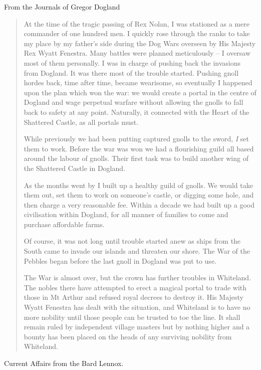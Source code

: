From the Journals of Gregor Dogland

\begin{quotation}

	At the time of the tragic passing of Rex Nolan, I was stationed as a mere commander of one hundred men.  I quickly rose through the ranks to take my place by my father's side during the Dog Wars overseen by His Majesty Rex Wyatt Fenestra.  Many battles were planned meticulously -- I oversaw most of them personally.  I was in charge of pushing back the invasions from Dogland.  It was there most of the trouble started.  Pushing gnoll hordes back, time after time, became wearisome, so eventually I happened upon the plan which won the war: we would create a portal in the centre of Dogland and wage perpetual warfare without allowing the gnolls to fall back to safety at any point.  Naturally, it connected with the Heart of the Shattered Castle, as all portals must.

	While previously we had been putting captured gnolls to the sword, \emph{I} set them to work.  Before the war was won we had a flourishing guild all based around the labour of gnolls.  Their first task was to build another wing of the Shattered Castle in Dogland.

	As the months went by I built up a healthy guild of gnolls.  We would take them out, set them to work on someone's castle, or digging some hole, and then charge a very reasonable fee.  Within a decade we had built up a good civilisation within Dogland, for all manner of families to come and purchase affordable farms.

	Of course, it was not long until trouble started anew as ships from the South came to invade our islands and threaten our shore.  The War of the Pebbles began before the last gnoll in Dogland was put to use.

	The War is almost over, but the crown has further troubles in Whiteland.  The nobles there have attempted to erect a magical portal to trade with those in Mt Arthur and refused royal decrees to destroy it.  His Majesty Wyatt Fenestra has dealt with the situation, and Whiteland is to have no more nobility until those people can be trusted to toe the line.  It shall remain ruled by independent village masters but by nothing higher and a bounty has been placed on the heads of any surviving nobility from Whiteland.

\end{quotation}

Current Affairs from the Bard Lennox.

